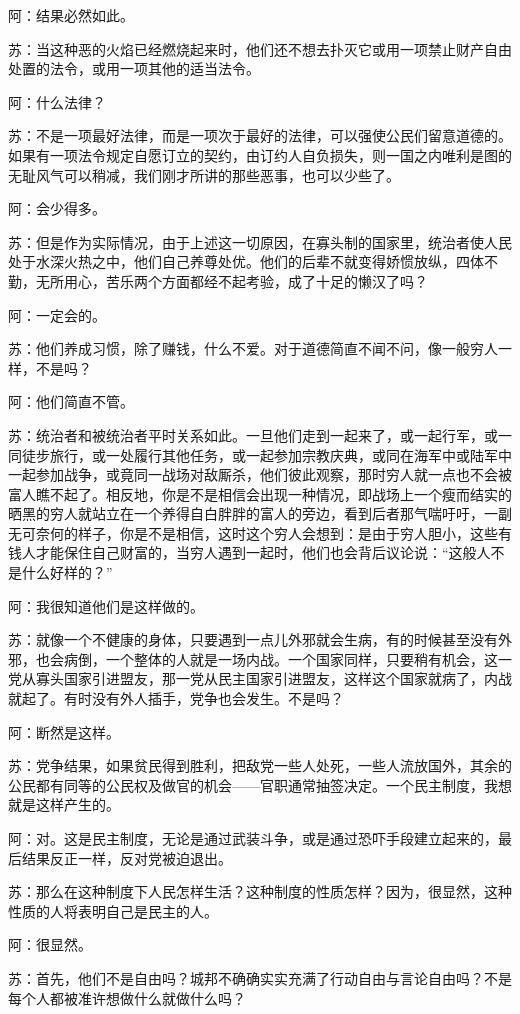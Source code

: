 \documentclass[12pt,oneside]{book}
\begin{document}
阿：结果必然如此。

苏：当这种恶的火焰已经燃烧起来时，他们还不想去扑灭它或用一项禁止财产自由处置的法令，或用一项其他的适当法令。

阿：什么法律？

苏：不是一项最好法律，而是一项次于最好的法律，可以强使公民们留意道德的。如果有一项法令规定自愿订立的契约，由订约人自负损失，则一国之内唯利是图的无耻风气可以稍减，我们刚才所讲的那些恶事，也可以少些了。

阿：会少得多。

苏：但是作为实际情况，由于上述这一切原因，在寡头制的国家里，统治者使人民处于水深火热之中，他们自己养尊处优。他们的后辈不就变得娇惯放纵，四体不勤，无所用心，苦乐两个方面都经不起考验，成了十足的懒汉了吗？

阿：一定会的。

苏：他们养成习惯，除了赚钱，什么不爱。对于道德简直不闻不问，像一般穷人一样，不是吗？

阿：他们简直不管。

苏：统治者和被统治者平时关系如此。一旦他们走到一起来了，或一起行军，或一同徒步旅行，或一处履行其他任务，或一起参加宗教庆典，或同在海军中或陆军中一起参加战争，或竟同一战场对敌厮杀，他们彼此观察，那时穷人就一点也不会被富人瞧不起了。相反地，你是不是相信会出现一种情况，即战场上一个瘦而结实的晒黑的穷人就站立在一个养得自白胖胖的富人的旁边，看到后者那气喘吁吁，一副无可奈何的样子，你是不是相信，这时这个穷人会想到：是由于穷人胆小，这些有钱人才能保住自己财富的，当穷人遇到一起时，他们也会背后议论说：“这般人不是什么好样的？”

阿：我很知道他们是这样做的。

苏：就像一个不健康的身体，只要遇到一点儿外邪就会生病，有的时候甚至没有外邪，也会病倒，一个整体的人就是一场内战。一个国家同样，只要稍有机会，这一党从寡头国家引进盟友，那一党从民主国家引进盟友，这样这个国家就病了，内战就起了。有时没有外人插手，党争也会发生。不是吗？

阿：断然是这样。

苏：党争结果，如果贫民得到胜利，把敌党一些人处死，一些人流放国外，其余的公民都有同等的公民权及做官的机会——官职通常抽签决定。一个民主制度，我想就是这样产生的。

阿：对。这是民主制度，无论是通过武装斗争，或是通过恐吓手段建立起来的，最后结果反正一样，反对党被迫退出。

苏：那么在这种制度下人民怎样生活？这种制度的性质怎样？因为，很显然，这种性质的人将表明自己是民主的人。

阿：很显然。

苏：首先，他们不是自由吗？城邦不确确实实充满了行动自由与言论自由吗？不是每个人都被准许想做什么就做什么吗？
\end{document}
